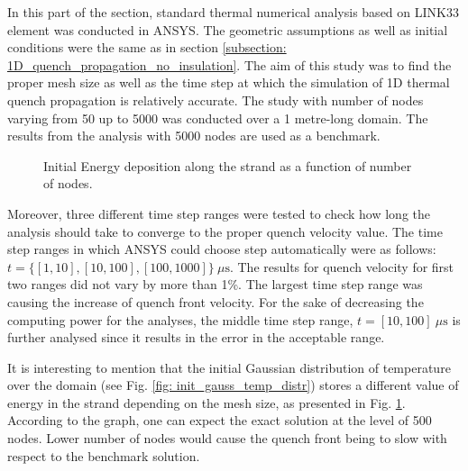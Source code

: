 
In this part of the section, standard thermal numerical analysis based on LINK33 element was conducted in ANSYS. The geometric assumptions as well as initial conditions were the same as in section \ref{subsection: 1D_quench_propagation_no_insulation}. The aim of this study was to find the proper mesh size as well as the time step at which the simulation of 1D thermal quench propagation is relatively accurate. The study with number of nodes varying from 50 up to 5000 was conducted over a 1 metre-long domain. The results from the analysis with 5000 nodes are used as a benchmark. 

\begin{figure}[h!]
\centering
    \caption{Initial Energy deposition along the strand as a function of number of nodes.}
    \label{fig: q_vel_modelling_energy_deposition}
\end{figure}

Moreover, three different time step ranges were tested to check how long the analysis should take to converge to the proper quench velocity value. The time step ranges in which ANSYS could choose step automatically were as follows:  $t= \{[1, 10], [10, 100], [100, 1000]\}~\mu \text{s}$. The results for quench velocity for first two ranges did not vary by more than 1\%. The largest time step range was causing the increase of quench front velocity. For the sake of decreasing the computing power for the analyses, the middle time step range,  $t=[10, 100]~\mu \text{s}$ is further analysed since it results in the error in the acceptable range.

It is interesting to mention that the initial Gaussian distribution of temperature over the domain (see Fig. \ref{fig: init_gauss_temp_distr}) stores a different value of energy in the strand depending on the mesh size, as presented in Fig. \ref{fig: q_vel_modelling_energy_deposition}. According to the graph, one can expect the exact solution at the level of 500 nodes. Lower number of nodes would cause the quench front being to slow with respect to the benchmark solution.

